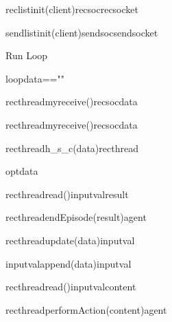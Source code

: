 \documentclass{article}
\begin{document}
\begin{figure}
\begin{sequencediagram}[.65]
		\begin{call}{reclist}{init(client)}{recsoc}{recsocket}
		\end{call}			
		\begin{call}{sendlist}{init(client)}{sendsoc}{sendsocket}
		\end{call}				
		\postlevel\postlevel
		\begin{sdblock}[green!20]{Run Loop}{}
			\begin{sdblock}{loop}{data==""}
				\begin{call}{recthread}{myreceive()}{recsoc}{data}
				\end{call}		
			\end{sdblock}	
			\begin{call}{recthread}{myreceive()}{recsoc}{data}
			\end{call}					
			\begin{call}{recthread}{\small h\_s\_c(data)}{recthread}{}
				\begin{sdblock}{opt}{data}
					\begin{call}{recthread}{read()}{inputval}{result}
					\end{call}
					\begin{messcall}{recthread}{\small endEpisode(result)}{agent}
					\end{messcall}
				\end{sdblock}
			\end{call}
			\begin{messcall}{recthread}{update(data)}{inputval}{}
				\begin{call}{inputval}{\scriptsize append(data)}{inputval}{}
				\end{call}				
			\end{messcall}
			\begin{call}{recthread}{read()}{inputval}{content}
			\end{call}
			\begin{messcall}{recthread}{performAction(content)}{agent}{}
			\end{messcall}
		\end{sdblock}
		
		
		
		
		

	\end{sequencediagram}

\end{figure}	
	
\end{document}
